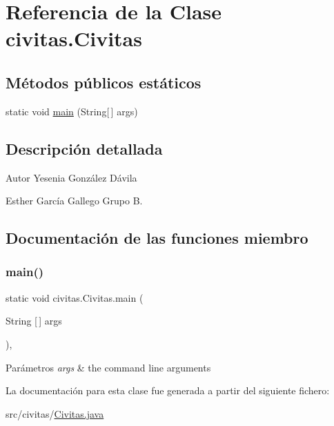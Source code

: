 \hypertarget{classcivitas_1_1Civitas}{}\section{Referencia de la Clase civitas.\+Civitas}
\label{classcivitas_1_1Civitas}
\subsection*{Métodos públicos estáticos}
\begin{DoxyCompactItemize}
\item 
static void \hyperlink{classcivitas_1_1Civitas_aafbfc82fe65ead98cdfa0fecd0e38bfc}{main} (String\mbox{[}$\,$\mbox{]} args)
\end{DoxyCompactItemize}


\subsection{Descripción detallada}
\begin{DoxyAuthor}{Autor}
Yesenia González Dávila 

Esther García Gallego Grupo B. 
\end{DoxyAuthor}


\subsection{Documentación de las funciones miembro}
\mbox{\label{classcivitas_1_1Civitas_aafbfc82fe65ead98cdfa0fecd0e38bfc}} 
\subsubsection{\texorpdfstring{main()}{main()}}
{\footnotesize\ttfamily static void civitas.\+Civitas.\+main (\begin{DoxyParamCaption}\item[{String \mbox{[}$\,$\mbox{]}}]{args }\end{DoxyParamCaption})\hspace{0.3cm}{\ttfamily [inline]}, {\ttfamily [static]}}


\begin{DoxyParams}{Parámetros}
{\em args} & the command line arguments \\
\hline
\end{DoxyParams}


La documentación para esta clase fue generada a partir del siguiente fichero\+:\begin{DoxyCompactItemize}
\item 
src/civitas/\hyperlink{Civitas_8java}{Civitas.\+java}\end{DoxyCompactItemize}
